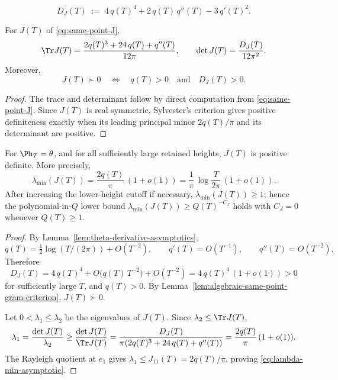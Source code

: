 \begin{definition}
\label{def:same-point-gram-determinant}
\begin{equation}
\label{eq:same-point-gram-determinant}
D_J(T) \;:=\; 4\,q(T)^4 + 2\,q(T)\,q''(T) - 3\,q'(T)^2.
\end{equation}
\end{definition}

\begin{lemma}
\label{lem:algebraic-same-point-gram-criterion}
For \(J(T)\) of \eqref{eq:same-point-J},
\begin{equation}
\label{eq:J-trace-det}
\Tr J(T) = \frac{2 q(T)^3 + 24\,q(T) + q''(T)}{12\pi},\qquad
\det J(T) = \frac{D_J(T)}{12\pi^2}.
\end{equation}
Moreover,
\[
        J(T)\succ 0
        \quad\Longleftrightarrow\quad
        q(T) > 0 \quad\text{and}\quad D_J(T) > 0.
\]
\end{lemma}

\begin{proof}
The trace and determinant follow by direct computation from
\eqref{eq:same-point-J}.  Since \(J(T)\) is real symmetric,
Sylvester's criterion gives positive definiteness exactly when its
leading principal minor \(2q(T)/\pi\) and its determinant are
positive.
\end{proof}

\begin{lemma}
\label{lem:same-point-gram-positivity}
For \(\Ph_T = \theta\), and for all sufficiently large retained
heights, \(J(T)\) is positive definite.  More precisely,
\begin{equation}
\label{eq:lambda-min-asymptotic}
        \lambda_{\min}(J(T))
        = \frac{2 q(T)}{\pi}\,(1 + o(1))
        = \frac{1}{\pi}\,\log\frac{T}{2\pi}\,(1 + o(1)).
\end{equation}
After increasing the lower-height cutoff if necessary,
\(\lambda_{\min}(J(T)) \ge 1\); hence the polynomial-in-\(Q\) lower
bound \(\lambda_{\min}(J(T)) \ge Q(T)^{-C_J}\) holds with \(C_J = 0\)
whenever \(Q(T) \ge 1\).
\end{lemma}

\begin{proof}
By Lemma~\ref{lem:theta-derivative-asymptotics},
\[
q(T) = \tfrac12 \log(T/(2\pi)) + O(T^{-2}),\qquad
q'(T) = O(T^{-1}),\qquad q''(T) = O(T^{-2}).
\]
Therefore
\[
D_J(T) = 4\,q(T)^4 + O\!\bigl(q(T)\,T^{-2}\bigr) + O(T^{-2})
       = 4\,q(T)^4\,(1 + o(1)) > 0
\]
for sufficiently large \(T\), and \(q(T) > 0\).  By
Lemma~\ref{lem:algebraic-same-point-gram-criterion},
\(J(T) \succ 0\).

Let \(0 < \lambda_1 \le \lambda_2\) be the eigenvalues of \(J(T)\).
Since \(\lambda_2 \le \Tr J(T)\),
\[
\lambda_1 = \frac{\det J(T)}{\lambda_2}
          \ge \frac{\det J(T)}{\Tr J(T)}
          = \frac{D_J(T)}{\pi(2 q(T)^3 + 24\,q(T) + q''(T))}
          = \frac{2 q(T)}{\pi}\,(1 + o(1)).
\]
The Rayleigh quotient at \(e_1\) gives
\(\lambda_1 \le J_{11}(T) = 2 q(T)/\pi\), proving
\eqref{eq:lambda-min-asymptotic}.
\end{proof}

